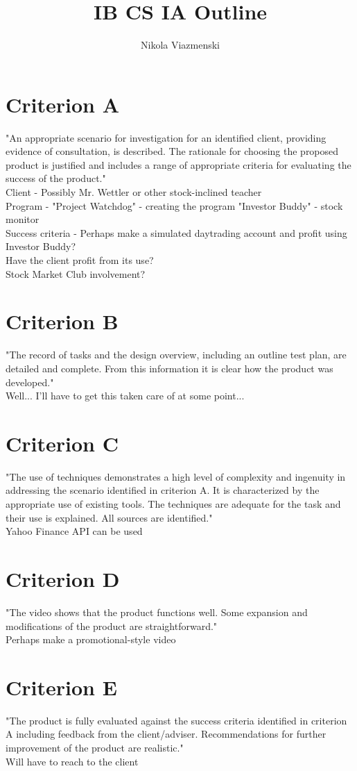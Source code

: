 \documentclass[]{article}
\title{IB CS IA Outline}
\author{Nikola Viazmenski}
\begin{document}
\maketitle


\section{Criterion A}
"An appropriate scenario for investigation for an identified client, providing evidence of consultation, is described. The rationale for choosing the proposed product is justified and includes a range of appropriate criteria for evaluating the success of the product."
\\ Client - Possibly Mr. Wettler or other stock-inclined teacher
\\ Program - "Project Watchdog" - creating the program "Investor Buddy" - stock monitor
\\ Success criteria - Perhaps make a simulated daytrading account and profit using Investor Buddy?
\\ Have the client profit from its use?
\\ Stock Market Club involvement?
\section{Criterion B}
"The record of tasks and the design overview, including an outline test plan, are detailed and complete. From this information it is clear how the product was developed."
\\ Well... I'll have to get this taken care of at some point...
\section{Criterion C}
"The use of techniques demonstrates a high level of complexity and ingenuity in addressing the scenario identified in criterion A. It is characterized by the appropriate use of existing tools. The techniques are adequate for the task and their use is explained. All sources are identified."
\\ Yahoo Finance API can be used
\section{Criterion D}
"The video shows that the product functions well. Some expansion and modifications of the product are straightforward."
\\ Perhaps make a promotional-style video
\section{Criterion E}
"The product is fully evaluated against the success criteria identified in criterion A including feedback from the client/adviser. Recommendations for further improvement of the product are realistic." 
\\ Will have to reach to the client
\end{document}
